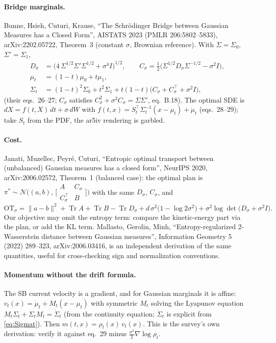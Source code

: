 \documentclass[11pt]{article}
\newcommand{\tr}{\operatorname{Tr}}
\begin{document}
\paragraph{Bridge marginals.} Bunne, Hsieh, Cuturi, Krause, ``The Schr\"odinger
Bridge between Gaussian Measures has a Closed Form'', AISTATS 2023 (PMLR
206:5802--5833), arXiv:2202.05722, Theorem~3 (constant $\sigma$, Brownian reference).
With $\Sigma=\Sigma_0$, $\Sigma'=\Sigma_1$,
\begin{align}
  D_\sigma &= \bigl(4\,\Sigma^{1/2}\Sigma'\Sigma^{1/2} + \sigma^4 I\bigr)^{1/2},\qquad
  C_\sigma = \tfrac12\bigl(\Sigma^{1/2} D_\sigma \Sigma^{-1/2} - \sigma^2 I\bigr),
  \label{eq:DC}\\
  \mu_t &= (1-t)\mu_0 + t\mu_1, \label{eq:mut}\\
  \Sigma_t &= (1-t)^2\Sigma_0 + t^2\Sigma_1 + t(1-t)\bigl(C_\sigma + C_\sigma^{\!\top} + \sigma^2 I\bigr),
  \label{eq:Sigmat}
\end{align}
(their eqs.~26--27; $C_\sigma$ satisfies $C_\sigma^2+\sigma^2 C_\sigma=\Sigma\Sigma'$,
eq.~B.18). The optimal SDE is $dX=f(t,X)\,dt+\sigma\,dW$ with
$f(t,x)=S_t^{\top}\Sigma_t^{-1}(x-\mu_t)+\dot\mu_t$ (eqs.~28--29); take $S_t$ from the
PDF, the ar5iv rendering is garbled.

\paragraph{Cost.} Janati, Muzellec, Peyr\'e, Cuturi, ``Entropic optimal transport
between (unbalanced) Gaussian measures has a closed form'', NeurIPS 2020,
arXiv:2006.02572, Theorem~1 (balanced case): the optimal plan is
$\pi^\ast\sim\mathcal N\bigl((a,b),\,\bigl[\begin{smallmatrix} A & C_\sigma\\ C_\sigma^{\top} & B\end{smallmatrix}\bigr]\bigr)$
with the same $D_\sigma$, $C_\sigma$, and
\[
  \mathrm{OT}_\sigma = \|a-b\|^2 + \tr A + \tr B - \tr D_\sigma
  + d\,\sigma^2\bigl(1-\log 2\sigma^2\bigr) + \sigma^2\log\det\bigl(D_\sigma+\sigma^2 I\bigr).
\]
Our objective may omit the entropy term: compare the kinetic-energy part via the
plan, or add the KL term. Mallasto, Gerolin, Minh, ``Entropy-regularized
2-Wasserstein distance between Gaussian measures'', Information Geometry 5 (2022)
289--323, arXiv:2006.03416, is an independent derivation of the same quantities,
useful for cross-checking sign and normalization conventions.

\paragraph{Momentum without the drift formula.} The SB current velocity is a
gradient, and for Gaussian marginals it is affine:
$v_t(x)=\dot\mu_t + M_t(x-\mu_t)$ with symmetric $M_t$ solving the Lyapunov
equation $M_t\Sigma_t+\Sigma_t M_t=\dot\Sigma_t$ (from the continuity equation;
$\dot\Sigma_t$ is explicit from \eqref{eq:Sigmat}). Then $m(t,x)=\rho_t(x)\,v_t(x)$.
This is the survey's own derivation: verify it against eq.~29 minus
$\tfrac{\sigma^2}{2}\nabla\log\rho_t$.
\end{document}

